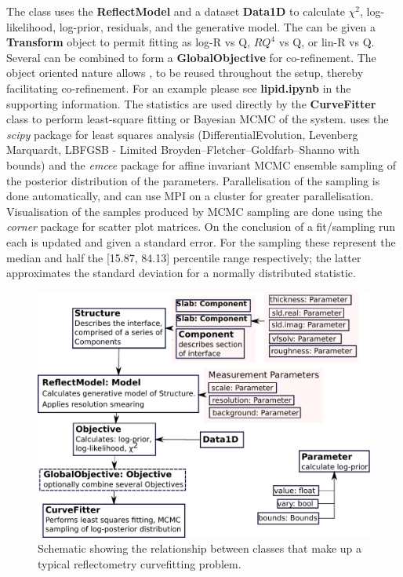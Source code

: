 \documentclass[12pt]{article}
\begin{document}
The \Objective class uses the \textbf{ReflectModel} and a dataset \textbf{Data1D} to calculate $\chi^2$, log-likelihood, log-prior, residuals, and the generative model. The \Objective can be given a \textbf{Transform} object to permit fitting as log-R vs Q, $RQ^4$ vs Q, or lin-R vs Q. Several \Objective can be combined to form a \textbf{GlobalObjective} for co-refinement. The object oriented nature allows \Parameter, \Component to be reused throughout the setup, thereby facilitating co-refinement. For an example please see \textbf{lipid.ipynb} in the supporting information.
The \Objective statistics are used directly by the \textbf{CurveFitter} class to perform least-square fitting or Bayesian MCMC of the system.  uses the \emph{scipy} package for least squares analysis (DifferentialEvolution, Levenberg Marquardt, LBFGSB - Limited Broyden–Fletcher–Goldfarb–Shanno with bounds) and the  \emph{emcee} package \cite{emcee} for affine invariant MCMC ensemble sampling of the posterior distribution of the parameters. Parallelisation of the sampling is done automatically, and can use MPI on a cluster for greater parallelisation. Visualisation of the samples produced by MCMC sampling are done using the \emph{corner} package \cite{corner} for scatter plot matrices. On the conclusion of a fit/sampling run each \Parameter is updated and given a standard error. For the sampling these represent the median and half the [15.87, 84.13] percentile range respectively; the latter approximates the standard deviation for a normally distributed statistic.

\begin{figure}
  \includegraphics[width=\linewidth]{components}
  \caption{Schematic showing the relationship between classes that make up a typical reflectometry curvefitting problem.}
  \label{fig:components}
\end{figure}
\end{document}
